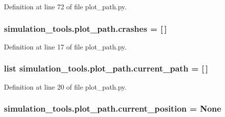 Definition at line 72 of file plot\+\_\+path.\+py.

\subsubsection[{\texorpdfstring{crashes}{crashes}}]{\setlength{\rightskip}{0pt plus 5cm}simulation\+\_\+tools.\+plot\+\_\+path.\+crashes = \mbox{[}$\,$\mbox{]}}\hypertarget{namespacesimulation__tools_1_1plot__path_aab95480216fce1ffe96669023bf16c42}{}\label{namespacesimulation__tools_1_1plot__path_aab95480216fce1ffe96669023bf16c42}


Definition at line 17 of file plot\+\_\+path.\+py.

\subsubsection[{\texorpdfstring{current\+\_\+path}{current_path}}]{\setlength{\rightskip}{0pt plus 5cm}list simulation\+\_\+tools.\+plot\+\_\+path.\+current\+\_\+path = \mbox{[}$\,$\mbox{]}}\hypertarget{namespacesimulation__tools_1_1plot__path_a35535ef467ee1df5ae54979d2d740601}{}\label{namespacesimulation__tools_1_1plot__path_a35535ef467ee1df5ae54979d2d740601}


Definition at line 20 of file plot\+\_\+path.\+py.

\subsubsection[{\texorpdfstring{current\+\_\+position}{current_position}}]{\setlength{\rightskip}{0pt plus 5cm}simulation\+\_\+tools.\+plot\+\_\+path.\+current\+\_\+position = None}\hypertarget{namespacesimulation__tools_1_1plot__path_a6630a10cacfc0f746555fc66794d66bb}{}\label{namespacesimulation__tools_1_1plot__path_a6630a10cacfc0f746555fc66794d66bb}


